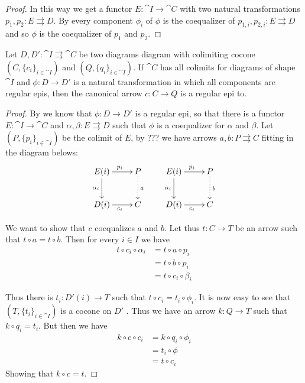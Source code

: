 {\begin{proof}
	In this way we get a functor $E\colon \cat{I}\to \cat{C}$ with two natural transformations $p_{1}, p_2\colon E\rightrightarrows D$. By  every component  $\phi_i$ of $\phi$ is the coequalizer of $p_{1,i}, p_{2,i}\colon E\rightrightarrows D$ and so $\phi$ is the coequalizer of $p_1$ and $p_2$.
\end{proof}



\begin{lemma}\label{lem:regepi}
	Let $D, D'\colon \cat{I}\rightrightarrows  \cat{C}$ be two diagrams diagram with colimiting cocone $(C, \{c_i\}_{i\in \cat{I}})$ and   $(Q, \{q_i\}_{i\in \cat{I}})$. If $\cat{C}$ has all colimits for diagrams of shape $\cat{I}$ and $\phi\colon D\to D'$ is a natural transformation in which all components are regular epis, then the canonical arrow  $c\colon C\to Q$ is a regular epi to.
\end{lemma}
\begin{proof}
	By  we know that $\phi\colon D\to D'$ is a regular epi, so that there is a functor $E\colon \cat{I}\to \cat{C}$ and $\alpha, \beta\colon E\rightrightarrows D$ such that $\phi$ is a coequalizer for $\alpha$ and $\beta$. Let $(P, \{p_i\}_{i\in \cat{I}})$ be the colimit of $E$, by ??? we have arrows $a, b\colon P\rightrightarrows  C$ fitting in the diagram belows:
	\[\xymatrix{E(i) \ar[r]^{p_i} \ar[d]_{\alpha_i}& P \ar@{.>}[d]^{a} & E(i) \ar[r]^{p_i} \ar[d]_{\alpha_i} & P \ar@{.>}[d]^{b}\\ D(i) \ar[r]_{c_i} & C & D(i) \ar[r]_{c_i} & C}\]
	
	We want to show that $c$ coequalizes $a$ and $b$. Let thus $t\colon C\to T$ be an arrow such that $t\circ a=t\circ b$. Then for every $i\in I$ we have 
	\begin{align*}
		t\circ c_i\circ \alpha_i&=t\circ a\circ p_i\\&=t\circ b\circ p_i\\&=t\circ c_i\circ \beta_i
	\end{align*}
	
	Thus there is $t_i\colon D'(i)\to T$ such that $t\circ c_i=t_i\circ \phi_i$. It is now easy to see that $(T, \{t_i\}_{i\in \cat{I}})$ is a cocone on $D'$ .  Thus we have an arrow $k\colon Q\to T$ such that $k\circ q_i=t_i$. But then we have
	\begin{align*}
		k\circ c\circ c_i&=k\circ q_i\circ \phi_i\\&=t_i\circ \phi\\&=t\circ c_i
	\end{align*}
	Showing that $k\circ c=t$. 
	

\end{proof}}
